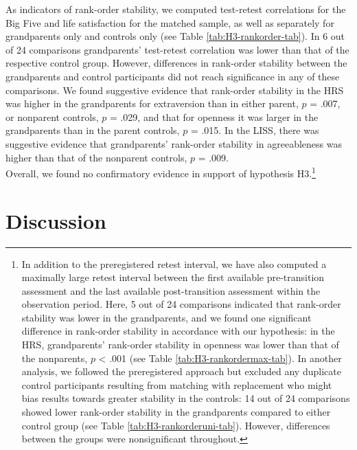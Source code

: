\documentclass[
  english,
  man, noextraspace]{apa7}
\begin{document}
As indicators of rank-order stability, we computed test-retest correlations for the Big Five and life satisfaction for the matched sample, as well as separately for grandparents only and controls only (see Table \ref{tab:H3-rankorder-tab}). In 6 out of 24 comparisons grandparents' test-retest correlation was lower than that of the respective control group. However, differences in rank-order stability between the grandparents and control participants did not reach significance in any of these comparisons. We found suggestive evidence that rank-order stability in the HRS was higher in the grandparents for extraversion than in either parent, \(p\) = .007, or nonparent controls, \(p\) = .029, and that for openness it was larger in the grandparents than in the parent controls, \(p\) = .015. In the LISS, there was suggestive evidence that grandparents' rank-order stability in agreeableness was higher than that of the nonparent controls, \(p\) = .009.\\
Overall, we found no confirmatory evidence in support of hypothesis H3.\footnote{In addition to the preregistered retest interval, we have also computed a maximally large retest interval between the first available pre-transition assessment and the last available post-transition assessment within the observation period. Here, 5 out of 24 comparisons indicated that rank-order stability was lower in the grandparents, and we found one significant difference in rank-order stability in accordance with our hypothesis: in the HRS, grandparents' rank-order stability in openness was lower than that of the nonparents, \(p\) \textless{} .001 (see Table \ref{tab:H3-rankordermax-tab}). In another analysis, we followed the preregistered approach but excluded any duplicate control participants resulting from matching with replacement who might bias results towards greater stability in the controls: 14 out of 24 comparisons showed lower rank-order stability in the grandparents compared to either control group (see Table \ref{tab:H3-rankorderuni-tab}). However, differences between the groups were nonsignificant throughout.}

\hypertarget{discussion}{%
\section{Discussion}\label{discussion}}
\end{document}
